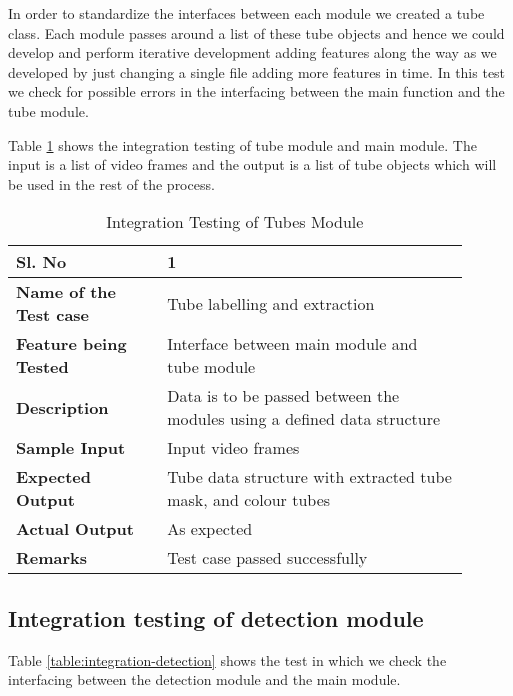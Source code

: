     In order to standardize the interfaces between each module we created a tube class. Each module passes around a list of these tube objects and hence we could develop and perform iterative development adding features along the way as we developed by just changing a single file adding more features in time. In this test we check for possible errors in the interfacing between the main function and the tube module.

    Table \ref{table:integration-tubes} shows the integration testing of tube module and main module. The input is a list of video frames and the output is a list of tube objects which will be used in the rest of the process.

    \FloatBarrier
    \begin{table}[H]
        \begin{tabular}{|p{0.3\linewidth}|p{0.6\linewidth}|}
            \hline
            \textbf{Sl. No }              &\textbf{ 1}\\
            \hline
            \textbf{Name of the Test case}  & Tube labelling and extraction \\
            \hline
            \textbf{Feature being Tested}  & Interface between main module and tube module \\
            \hline
            \textbf{Description}           & Data is to be passed between the modules using a defined data structure \\
            \hline
            \textbf{Sample Input}          & Input video frames \\
            \hline
            \textbf{Expected Output}       & Tube data structure with extracted tube mask, and colour tubes \\
            \hline
            \textbf{Actual Output}         & As expected \\
            \hline
            \textbf{Remarks }              & Test case passed successfully \\
            \hline
        \end{tabular}
        \caption{Integration Testing of Tubes Module}
        \label{table:integration-tubes}
    \end{table}


    \subsection{Integration testing of detection module}

    Table \ref{table:integration-detection} shows the test in which we check the interfacing between the detection module and the main module.

